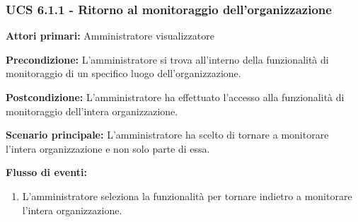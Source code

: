 \subsubsection{UCS 6.1.1 - Ritorno al monitoraggio dell'organizzazione}
	\item \textbf{Attori primari:} Amministratore visualizzatore
	\item \textbf{Precondizione:} L'amministratore si trova all'interno della funzionalità di monitoraggio di un specifico luogo dell'organizzazione.
	\item \textbf{Postcondizione:} L'amministratore ha effettuato l'accesso alla funzionalità di monitoraggio dell'intera organizzazione.
	\item \textbf{Scenario principale:} L'amministratore ha scelto di tornare a monitorare l'intera organizzazione e non solo parte di essa.
	\item \textbf{Flusso di eventi:}
    \begin{enumerate}
        \item  L'amministratore seleziona la funzionalità per tornare indietro a monitorare l'intera organizzazione.
    \end{enumerate}


